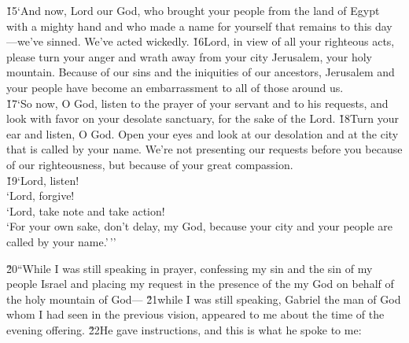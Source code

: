 \begin{poetry}
\poeml \v{15}`And now, Lord our God, who brought your people from the land of Egypt with a mighty hand and who made a name for yourself that remains to this day---we've sinned. We've acted wickedly. \v{16}Lord, in view of all your righteous acts, please turn your anger and wrath away from your city Jerusalem, your holy mountain. Because of our sins and the iniquities of our ancestors, Jerusalem and your people have become an embarrassment to all of those around us. \\
\poeml \v{17}`So now, O God, listen to the prayer of your servant and to his requests, and look with favor on your desolate sanctuary, for the sake of the Lord. \v{18}Turn your ear and listen, O God. Open your eyes and look at our desolation and at the city that is called by your name. We're not presenting our requests before you because of our righteousness, but because of your great compassion. \\
\poeml \v{19}`Lord, listen! \\
\poeml `Lord, forgive! \\
\poeml `Lord, take note and take action! \\
\poeml `For your own sake, don't delay, my God, because your city and your people are called by your name.'\,''
\end{poetry}

\v{20}``While I was still speaking in prayer, confessing my sin and the sin of my people Israel and placing my request in the presence of the  my God on behalf of the holy mountain of God--- \v{21}while I was still speaking, Gabriel the man of God whom I had seen in the previous vision, appeared to me about the time of the evening offering. \v{22}He gave instructions, and this is what he spoke to me:

